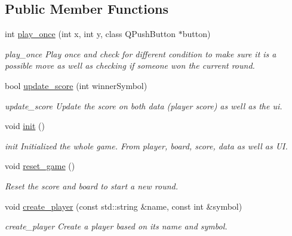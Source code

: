 \subsection*{Public Member Functions}
\begin{DoxyCompactItemize}
\item 
int \hyperlink{class_tic_tac_toe_game_manager_af276b6b66af26c170801bdd7aa1fd2f6}{play\+\_\+once} (int x, int y, class Q\+Push\+Button $\ast$button)
\begin{DoxyCompactList}\small\item\em play\+\_\+once Play once and check for different condition to make sure it is a possible move as well as checking if someone won the current round. \end{DoxyCompactList}\item 
bool \hyperlink{class_tic_tac_toe_game_manager_a4df4150f4292a51a8f711b3cf62e2608}{update\+\_\+score} (int winner\+Symbol)
\begin{DoxyCompactList}\small\item\em update\+\_\+score Update the score on both data (player score) as well as the ui. \end{DoxyCompactList}\item 
\mbox{\label{class_tic_tac_toe_game_manager_a3dcf19f39ad3e65853c884bc29430460}} 
void \hyperlink{class_tic_tac_toe_game_manager_a3dcf19f39ad3e65853c884bc29430460}{init} ()
\begin{DoxyCompactList}\small\item\em init Initialized the whole game. From player, board, score, data as well as UI. \end{DoxyCompactList}\item 
\mbox{\label{class_tic_tac_toe_game_manager_a8d8d0b8f023beb5dab9357b263be44a9}} 
void \hyperlink{class_tic_tac_toe_game_manager_a8d8d0b8f023beb5dab9357b263be44a9}{reset\+\_\+game} ()
\begin{DoxyCompactList}\small\item\em Reset the score and board to start a new round. \end{DoxyCompactList}\item 
void \hyperlink{class_tic_tac_toe_game_manager_a2d2b1cf7c29f760811f3ecc983dd2c5f}{create\+\_\+player} (const std\+::string \&name, const int \&symbol)
\begin{DoxyCompactList}\small\item\em create\+\_\+player Create a player based on its name and symbol. \end{DoxyCompactList}\item 

\end{DoxyCompactItemize}
